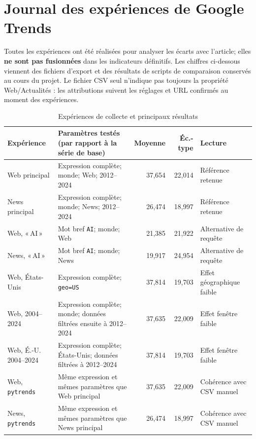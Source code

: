 \documentclass[11pt,a4paper]{article}
\begin{document}
\section{Journal des expériences de Google Trends}
Toutes les expériences ont été réalisées pour analyser les écarts avec l'article; elles \textbf{ne sont pas fusionnées} dans les indicateurs définitifs. Les chiffres ci-dessous viennent des fichiers d'export et des résultats de scripts de comparaison conservés au cours du projet. Le fichier CSV seul n'indique pas toujours la propriété Web/Actualités : les attributions suivent les réglages et URL confirmés au moment des expériences.

\begin{table}[H]
\centering\scriptsize
\caption{Expériences de collecte et principaux résultats}
\begin{tabularx}{\textwidth}{@{}>{\RaggedRight\arraybackslash}p{2.0cm}Yrr>{\RaggedRight\arraybackslash}p{2.4cm}@{}}\toprule
Expérience & Paramètres testés (par rapport à la série de base) & Moyenne & Éc.-type & Lecture\\\midrule
Web principal & Expression complète; monde; Web; 2012--2024 & 37,654 & 22,014 & Référence retenue\\
News principal & Expression complète; monde; News; 2012--2024 & 26,474 & 18,997 & Référence retenue\\
Web, «\,AI\,» & Mot bref \texttt{AI}; monde; Web & 21,385 & 21,922 & Alternative de requête\\
News, «\,AI\,» & Mot bref \texttt{AI}; monde; News & 19,917 & 24,954 & Alternative de requête\\
Web, États-Unis & Expression complète; \texttt{geo=US} & 37,814 & 19,703 & Effet géographique faible\\
Web, 2004--2024 & Expression complète; monde; données filtrées ensuite à 2012--2024 & 37,635 & 22,009 & Effet fenêtre faible\\
Web, É.-U. 2004--2024 & Expression complète; États-Unis; données filtrées à 2012--2024 & 37,814 & 19,703 & Effet fenêtre faible\\
Web, \texttt{pytrends} & Même expression et mêmes paramètres que Web principal & 37,635 & 22,009 & Cohérence avec CSV manuel\\
News, \texttt{pytrends} & Même expression et mêmes paramètres que News principal & 26,474 & 18,997 & Cohérence avec CSV manuel\\\bottomrule
\end{tabularx}
\end{table}
\end{document}
